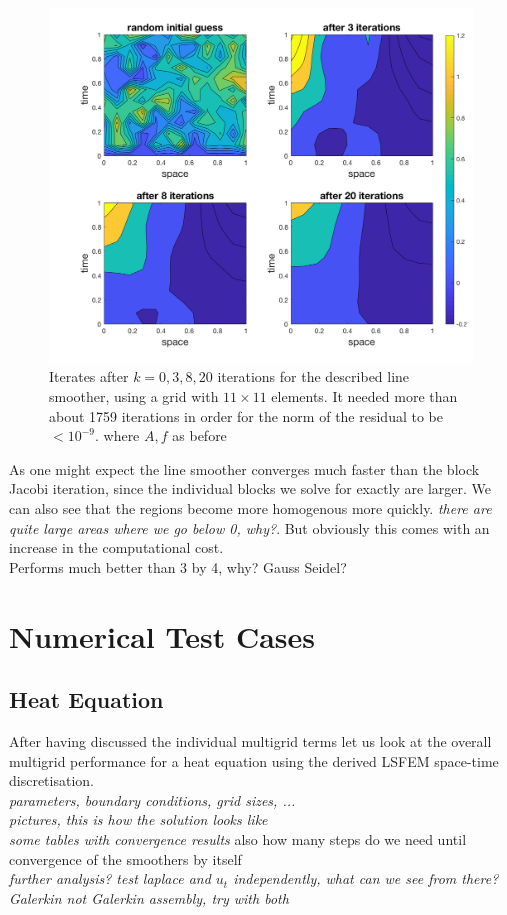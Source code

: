 \documentclass[../draft_1.tex]{subfiles}
\begin{document}
\begin{figure}[ht!]
	\centering
	\includegraphics[scale=0.28]{images/implementation/contour_plot_1_lineSm}
	\caption{Iterates after $k = 0,3,8, 20$ iterations for the described line smoother, using a grid with $11 \times 11$ elements. It needed more than about 1759 iterations in order for the norm of the residual to be $< 10^{-9}$. where $A, f$ as before}
\end{figure}

As one might expect the line smoother converges much faster than the block Jacobi iteration, since the individual blocks we solve for exactly are larger. We can also see that the regions become more homogenous more quickly. \textit{there are quite large areas where we go below 0, why?}. But obviously this comes with an increase in the computational cost. 
\\
Performs much better than 3 by 4, why? Gauss Seidel? 

\pagebreak
\section{Numerical Test Cases}
\subsection{Heat Equation}

After having discussed the individual multigrid terms let us look at the overall multigrid performance for a heat equation using the derived LSFEM space-time discretisation. 
\bigskip
\\
\textit{parameters, boundary conditions, grid sizes, ...}
\bigskip
\\
\textit{pictures, this is how the solution looks like}
\bigskip
\\
\textit{some tables with convergence results}
also how many steps do we need until convergence of the smoothers by itself
\bigskip
\\
\textit{further analysis? test laplace and $u_t$ independently, what can we see from there?}
\\
\textit{Galerkin not Galerkin assembly, try with both}
\end{document}
